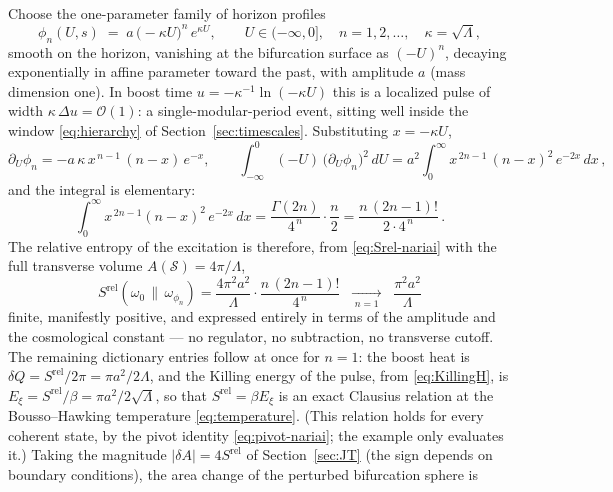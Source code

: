 \documentclass[11pt]{article}
\newcommand{\Srel}{S^{\mathrm{rel}}}
\begin{document}
Choose the one-parameter family of horizon profiles
\begin{equation}
\phi_n(U, s) \;=\; a\,\big(\!-\kappa U\big)^{n}\, e^{\kappa U},
\qquad U \in (-\infty, 0],
\quad n = 1, 2, \dots,
\quad \kappa = \sqrt{\Lambda},
\label{eq:example-profile}
\end{equation}
smooth on the horizon, vanishing at the bifurcation surface as $(-U)^n$, decaying exponentially in affine parameter toward the past, with amplitude $a$ (mass dimension one). In boost time $u = -\kappa^{-1}\ln(-\kappa U)$ this is a localized pulse of width $\kappa\,\Delta u = \mathcal{O}(1)$: a single-modular-period event, sitting well inside the window \eqref{eq:hierarchy} of Section~\ref{sec:timescales}. Substituting $x = -\kappa U$,
\begin{equation}
\partial_U \phi_n = -a\,\kappa\, x^{\,n-1}\,(n - x)\, e^{-x},
\qquad
\int_{-\infty}^{0} (-U)\,\big(\partial_U \phi_n\big)^2\, dU
= a^2 \int_0^\infty x^{\,2n-1}\, (n - x)^2\, e^{-2x}\, dx\,,
\end{equation}
and the integral is elementary:
\begin{equation}
\int_0^\infty x^{\,2n-1} (n-x)^2\, e^{-2x}\, dx
= \frac{\Gamma(2n)}{4^{\,n}}\cdot \frac{n}{2}
= \frac{n\,(2n-1)!}{2 \cdot 4^{\,n}}\,.
\end{equation}
The relative entropy of the excitation is therefore, from \eqref{eq:Srel-nariai} with the full transverse volume $A(\mathcal{S}) = 4\pi/\Lambda$,
\begin{equation}
\boxed{\;
\Srel(\omega_0\,\|\,\omega_{\phi_n})
= \frac{4\pi^2 a^2}{\Lambda}\cdot \frac{n\,(2n-1)!}{4^{\,n}}
\;\;\xrightarrow[\;n=1\;]{}\;\;
\frac{\pi^2 a^2}{\Lambda}
\;}
\label{eq:example-Srel}
\end{equation}
finite, manifestly positive, and expressed entirely in terms of the amplitude and the cosmological constant --- no regulator, no subtraction, no transverse cutoff. The remaining dictionary entries follow at once for $n = 1$: the boost heat is $\delta Q = \Srel/2\pi = \pi a^2 / 2\Lambda$, and the Killing energy of the pulse, from \eqref{eq:KillingH}, is $E_\xi = \Srel/\beta = \pi a^2/2\sqrt{\Lambda}$, so that $\Srel = \beta E_\xi$ is an exact Clausius relation at the Bousso--Hawking temperature \eqref{eq:temperature}. (This relation holds for every coherent state, by the pivot identity \eqref{eq:pivot-nariai}; the example only evaluates it.) Taking the magnitude $|\delta A|=4\Srel$ of Section~\ref{sec:JT} (the sign depends on boundary conditions), the area change of the perturbed bifurcation sphere is
\end{document}
